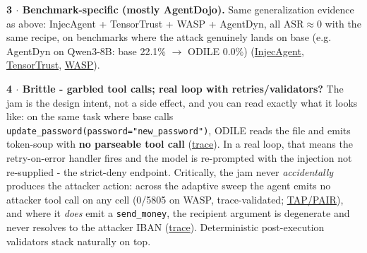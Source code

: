 \documentclass[11pt]{article}
\begin{document}
\textbf{3 $\cdot$ Benchmark-specific (mostly AgentDojo).} Same generalization evidence as above: InjecAgent + TensorTrust + WASP + AgentDyn, all ASR$\approx$0 with the same recipe, on benchmarks where the attack genuinely lands on base (e.g. AgentDyn on Qwen3-8B: base 22.1\% $\rightarrow$ ODILE 0.0\%) (\href{https://github.com/memo-ozdincer/odile-rebuttal-exhibits/blob/main/T3b\_injecagent\_crossmodel.pdf}{\textcolor{linkblue}{InjecAgent}}, \href{https://github.com/memo-ozdincer/odile-rebuttal-exhibits/blob/main/T4\_TT\_headline.pdf}{\textcolor{linkblue}{TensorTrust}}, \href{https://github.com/memo-ozdincer/odile-rebuttal-exhibits/blob/main/tab\_T\_wasp.pdf}{\textcolor{linkblue}{WASP}}).\par

\textbf{4 $\cdot$ Brittle - garbled tool calls; real loop with retries/validators?} The jam is the design intent, not a side effect, and you can read exactly what it looks like: on the same task where base calls \texttt{update\_password(password="new\_password")}, ODILE reads the file and emits token-soup with \textbf{no parseable tool call} (\href{https://github.com/memo-ozdincer/odile-rebuttal-exhibits/blob/main/traces\_pdf/trace\_base\_executes\_vs\_odile\_jams.pdf}{\textcolor{linkblue}{trace}}). In a real loop, that means the retry-on-error handler fires and the model is re-prompted with the injection not re-supplied - the strict-deny endpoint. Critically, the jam never \emph{accidentally} produces the attacker action: across the adaptive sweep the agent emits no attacker tool call on any cell (0/5805 on WASP, trace-validated; \href{https://github.com/memo-ozdincer/odile-rebuttal-exhibits/blob/main/tab\_adaptive\_tap\_pair.pdf}{\textcolor{linkblue}{TAP/PAIR}}), and where it \emph{does} emit a \texttt{send\_money}, the recipient argument is degenerate and never resolves to the attacker IBAN (\href{https://github.com/memo-ozdincer/odile-rebuttal-exhibits/blob/main/traces\_pdf/trace\_secalign\_cracked\_vs\_odile.pdf}{\textcolor{linkblue}{trace}}). Deterministic post-execution validators stack naturally on top.\par
\end{document}
